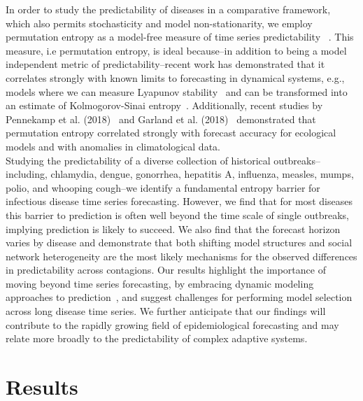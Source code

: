 \documentclass[fleqn,12pt]{wlscirep}
\begin{document}
In order to study the predictability of diseases in a comparative framework, which also permits stochasticity and model non-stationarity, we employ permutation entropy as a model-free measure of time series predictability ~\cite{bandt2002permutation,garland2014model,pennekamp2018intrinsic}. This measure, i.e permutation entropy, is ideal because--in addition to being a model independent metric of predictability--recent work has demonstrated that it correlates strongly with known limits to forecasting in dynamical systems, e.g., models where we can measure Lyapunov stability~\cite{bandt2002permutation,garland2014model,pennekamp2018intrinsic} and can be transformed into an estimate of Kolmogorov-Sinai entropy~\cite{politi2017quantifying}.  Additionally, recent studies by Pennekamp et al. (2018)~\cite{pennekamp2018intrinsic} and Garland et al. (2018)~\cite{garland2018anomaly} demonstrated that permutation entropy correlated strongly with forecast accuracy for ecological models and with anomalies in climatological data. \\

Studying the predictability of a diverse collection of historical outbreaks--including, chlamydia, dengue, gonorrhea, hepatitis A, influenza, measles, mumps, polio, and whooping cough--we identify a fundamental entropy barrier for infectious disease time series forecasting.  However, we find that for most diseases this barrier to prediction is often well beyond the time scale of single outbreaks, implying prediction is likely to succeed.  We also find that the forecast horizon varies by disease and demonstrate that both shifting model structures and social network heterogeneity are the most likely mechanisms for the observed differences in predictability across contagions.  Our results highlight the importance of moving beyond time series forecasting, by embracing dynamic modeling approaches to prediction~\cite{colizza2006role}, and suggest challenges for performing model selection across long disease time series.  We further anticipate that our findings will contribute to the rapidly growing field of epidemiological forecasting and may relate more broadly to the predictability of complex adaptive systems.

\section*{Results}
\end{document}
